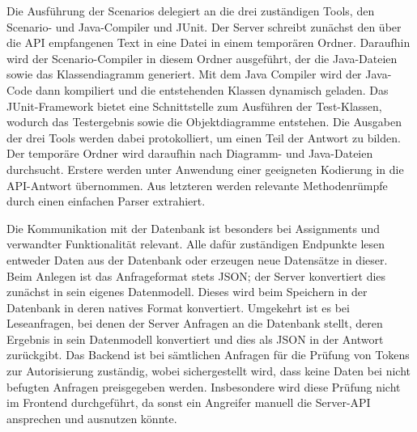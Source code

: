 Die Ausführung der Scenarios delegiert an die drei zuständigen Tools,
den Scenario- und Java-Compiler und JUnit.
Der Server schreibt zunächst den über die API empfangenen Text in eine Datei in einem temporären Ordner.
Daraufhin wird der Scenario-Compiler in diesem Ordner ausgeführt,
der die Java-Dateien sowie das Klassendiagramm generiert.
Mit dem Java Compiler wird der Java-Code dann kompiliert und die entstehenden Klassen dynamisch geladen.
Das JUnit-Framework bietet eine Schnittstelle zum Ausführen der Test-Klassen,
wodurch das Testergebnis sowie die Objektdiagramme entstehen.
Die Ausgaben der drei Tools werden dabei protokolliert, um einen Teil der Antwort zu bilden.
Der temporäre Ordner wird daraufhin nach Diagramm- und Java-Dateien durchsucht.
Erstere werden unter Anwendung einer geeigneten Kodierung in die API-Antwort übernommen.
Aus letzteren werden relevante Methodenrümpfe durch einen einfachen Parser extrahiert.

Die Kommunikation mit der Datenbank ist besonders bei Assignments und verwandter Funktionalität relevant.
Alle dafür zuständigen Endpunkte lesen entweder Daten aus der Datenbank oder erzeugen neue Datensätze in dieser.
Beim Anlegen ist das Anfrageformat stets JSON;
der Server konvertiert dies zunächst in sein eigenes Datenmodell.
Dieses wird beim Speichern in der Datenbank in deren natives Format konvertiert.
Umgekehrt ist es bei Leseanfragen, bei denen der Server Anfragen an die Datenbank stellt,
deren Ergebnis in sein Datenmodell konvertiert und dies als JSON in der Antwort zurückgibt.
Das Backend ist bei sämtlichen Anfragen für die Prüfung von Tokens zur Autorisierung zuständig,
wobei sichergestellt wird, dass keine Daten bei nicht befugten Anfragen preisgegeben werden.
Insbesondere wird diese Prüfung nicht im Frontend durchgeführt,
da sonst ein Angreifer manuell die Server-API ansprechen und ausnutzen könnte.

